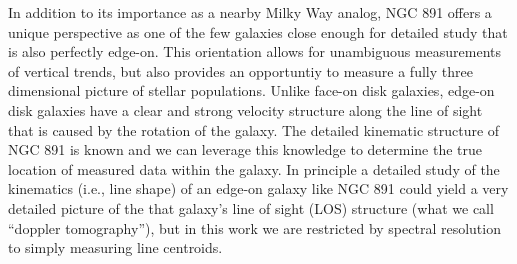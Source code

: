 





In addition to its importance as a nearby Milky Way analog, NGC 891
offers a unique perspective as one of the few galaxies close enough
for detailed study that is also perfectly edge-on. This orientation
allows for unambiguous measurements of vertical trends, but also
provides an opportuntiy to measure a fully three dimensional picture
of stellar populations. Unlike face-on disk galaxies, edge-on disk
galaxies have a clear and strong velocity structure along the line of
sight that is caused by the rotation of the galaxy. The detailed
kinematic structure of NGC 891 is known
\citep{Swaters97,Kregel05,Oosterloo07} and we can leverage this
knowledge to determine the true location of measured data within the
galaxy. In principle a detailed study of the kinematics (i.e., line
shape) of an edge-on galaxy like NGC 891 could yield a very detailed
picture of the that galaxy's line of sight (LOS) structure (what we
call ``doppler tomography''), but in this work we are restricted by
spectral resolution to simply measuring line centroids.


